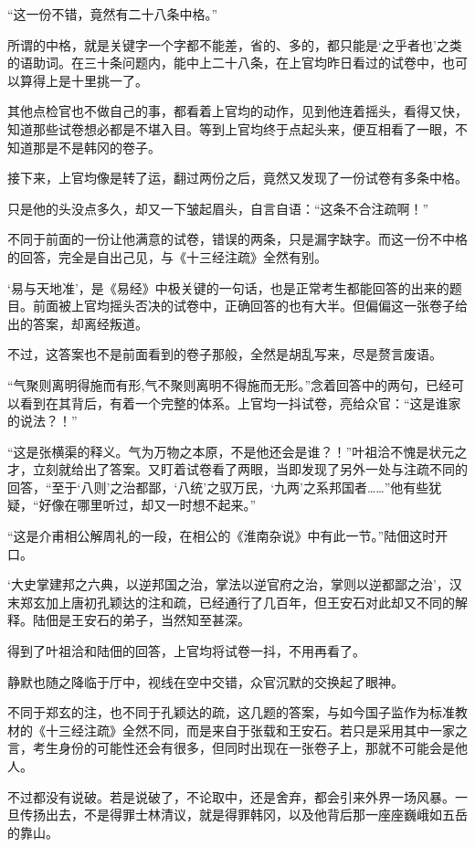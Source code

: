 “这一份不错，竟然有二十八条中格。”

所谓的中格，就是关键字一个字都不能差，省的、多的，都只能是‘之乎者也’之类的语助词。在三十条问题内，能中上二十八条，在上官均昨日看过的试卷中，也可以算得上是十里挑一了。

其他点检官也不做自己的事，都看着上官均的动作，见到他连着摇头，看得又快，知道那些试卷想必都是不堪入目。等到上官均终于点起头来，便互相看了一眼，不知道那是不是韩冈的卷子。

接下来，上官均像是转了运，翻过两份之后，竟然又发现了一份试卷有多条中格。

只是他的头没点多久，却又一下皱起眉头，自言自语：“这条不合注疏啊！”

不同于前面的一份让他满意的试卷，错误的两条，只是漏字缺字。而这一份不中格的回答，完全是自出己见，与《十三经注疏》全然有别。

‘易与天地准’，是《易经》中极关键的一句话，也是正常考生都能回答的出来的题目。前面被上官均摇头否决的试卷中，正确回答的也有大半。但偏偏这一张卷子给出的答案，却离经叛道。

不过，这答案也不是前面看到的卷子那般，全然是胡乱写来，尽是赘言废语。

“气聚则离明得施而有形,气不聚则离明不得施而无形。”念着回答中的两句，已经可以看到在其背后，有着一个完整的体系。上官均一抖试卷，亮给众官：“这是谁家的说法？！”

“这是张横渠的释义。气为万物之本原，不是他还会是谁？！”叶祖洽不愧是状元之才，立刻就给出了答案。又盯着试卷看了两眼，当即发现了另外一处与注疏不同的回答，“至于‘八则’之治都鄙，‘八统’之驭万民，‘九两’之系邦国者……”他有些犹疑，“好像在哪里听过，却又一时想不起来。”

“这是介甫相公解周礼的一段，在相公的《淮南杂说》中有此一节。”陆佃这时开口。

‘大史掌建邦之六典，以逆邦国之治，掌法以逆官府之治，掌则以逆都鄙之治’，汉末郑玄加上唐初孔颖达的注和疏，已经通行了几百年，但王安石对此却又不同的解释。陆佃是王安石的弟子，当然知至甚深。

得到了叶祖洽和陆佃的回答，上官均将试卷一抖，不用再看了。

静默也随之降临于厅中，视线在空中交错，众官沉默的交换起了眼神。

不同于郑玄的注，也不同于孔颖达的疏，这几题的答案，与如今国子监作为标准教材的《十三经注疏》全然不同，而是来自于张载和王安石。若只是采用其中一家之言，考生身份的可能性还会有很多，但同时出现在一张卷子上，那就不可能会是他人。

不过都没有说破。若是说破了，不论取中，还是舍弃，都会引来外界一场风暴。一旦传扬出去，不是得罪士林清议，就是得罪韩冈，以及他背后那一座座巍峨如五岳的靠山。

